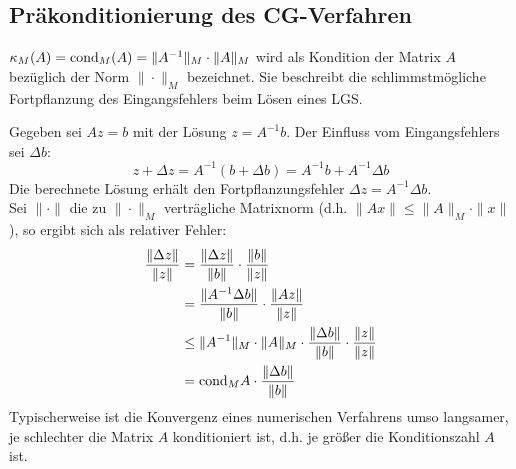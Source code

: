     \subsection{Präkonditionierung des CG-Verfahren}
    \begin{defbox}
        $\kappa_M(A) = \text{cond}_M(A) = \|A^{-1}\|_M\cdot \|A\|_M$ wird als Kondition der Matrix $A$ bezüglich 
        der Norm $\|\cdot\|_M$ bezeichnet. 
        Sie beschreibt die schlimmstmögliche Fortpflanzung des Eingangsfehlers beim Lösen eines LGS.
    \end{defbox}
    Gegeben sei $Az=b$ mit der Lösung $z=A^{-1}b$. Der Einfluss vom Eingangsfehlers sei $\Delta b$:
    \[z + \Delta z = A^{-1}(b+\Delta b) = A^{-1}b + A^{-1}\Delta b\]
    Die berechnete Lösung erhält den Fortpflanzungsfehler $\Delta z = A^{-1}\Delta b$. \\ 
    Sei $\|\cdot\|$ die zu $\|\cdot\|_M$ verträgliche Matrixnorm (d.h. $\|Ax\|\leq \|A\|_M\cdot\|x\|$), 
    so ergibt sich als relativer Fehler:
    \begin{align*}
        \dfrac{\|\Delta z\|}{\|z\|} &= \dfrac{\|\Delta z\|}{\|b\|} \cdot\dfrac{\|b\|}{\|z\|} \\
        &= \dfrac{\|A^{-1}\Delta b\|}{\|b\|} \cdot\dfrac{\|Az\|}{\|z\|} \\
        &\leq \|A^{-1}\|_M\cdot\|A\|_M\cdot\dfrac{\|\Delta b\|}{\|b\|}\cdot\dfrac{\|z\|}{\|z\|} \\
        &= \text{cond}_M{A}\cdot\dfrac{\|\Delta b\|}{\|b\|} \\
    \end{align*}
    Typischerweise ist die Konvergenz eines numerischen Verfahrens umso langsamer, je schlechter die Matrix $A$ 
    konditioniert ist, d.h. je größer die Konditionszahl $A$ ist. \\ \\
